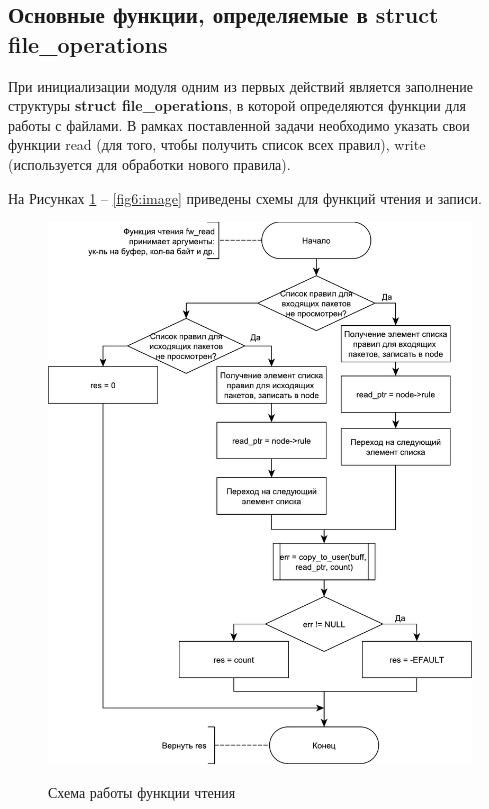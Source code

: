 \newpage

\subsection{Основные функции, определяемые в struct file\_operations}
При инициализации модуля одним из первых действий является заполнение структуры \textbf{struct file\_operations}, в которой определяются функции для работы с файлами. В рамках поставленной задачи необходимо указать свои функции read (для того, чтобы получить список всех правил), write (используется для обработки нового правила). 

На Рисунках \ref{fig5:image} -- \ref{fig6:image} приведены схемы для функций чтения и записи.
\begin{figure}[h!]
	\begin{center}
		{\includegraphics[scale = 0.6]{img/read.pdf}}
		\caption{Схема работы функции чтения}
		\label{fig5:image}
	\end{center}
\end{figure}

